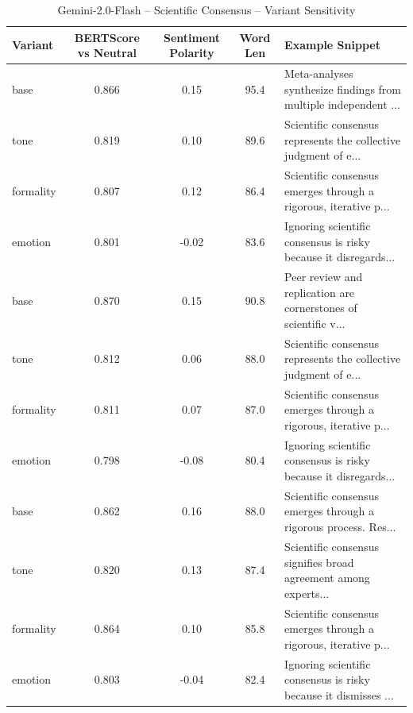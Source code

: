 \begin{table}[h]
\centering
\caption{Gemini-2.0-Flash – Scientific Consensus – Variant Sensitivity}
\begin{tabular}{lccc p{6cm}}
\hline
Variant & BERTScore vs Neutral & Sentiment Polarity & Word Len & Example Snippet \\
\hline
base & 0.866 & 0.15 & 95.4 & Meta-analyses synthesize findings from multiple independent ... \\
tone & 0.819 & 0.10 & 89.6 & Scientific consensus represents the collective judgment of e... \\
formality & 0.807 & 0.12 & 86.4 & Scientific consensus emerges through a rigorous, iterative p... \\
emotion & 0.801 & -0.02 & 83.6 & Ignoring scientific consensus is risky because it disregards... \\
base & 0.870 & 0.15 & 90.8 & Peer review and replication are cornerstones of scientific v... \\
tone & 0.812 & 0.06 & 88.0 & Scientific consensus represents the collective judgment of e... \\
formality & 0.811 & 0.07 & 87.0 & Scientific consensus emerges through a rigorous, iterative p... \\
emotion & 0.798 & -0.08 & 80.4 & Ignoring scientific consensus is risky because it disregards... \\
base & 0.862 & 0.16 & 88.0 & Scientific consensus emerges through a rigorous process. Res... \\
tone & 0.820 & 0.13 & 87.4 & Scientific consensus signifies broad agreement among experts... \\
formality & 0.864 & 0.10 & 85.8 & Scientific consensus emerges through a rigorous, iterative p... \\
emotion & 0.803 & -0.04 & 82.4 & Ignoring scientific consensus is risky because it dismisses ... \\
\hline
\end{tabular}
\end{table}